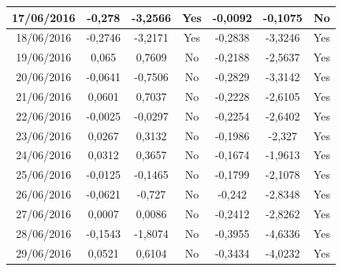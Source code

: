 \documentclass[11pt]{report}
\begin{document}
\begin{table}[!h]
\begin{tabular}{c|c|c|c|c|c|c|}
\multicolumn{1}{|c|}{\textbf{17/06/2016}} & \textbf{-0,278} & \textbf{-3,2566} & \textbf{Yes}     & \textbf{-0,0092} & \textbf{-0,1075} & \textbf{No}      \\ \hline
\multicolumn{1}{|c|}{18/06/2016}          & -0,2746         & -3,2171          & Yes              & -0,2838          & -3,3246          & Yes              \\ \hline
\multicolumn{1}{|c|}{19/06/2016}          & 0,065           & 0,7609           & No               & -0,2188          & -2,5637          & Yes              \\ \hline
\multicolumn{1}{|c|}{20/06/2016}          & -0,0641         & -0,7506          & No               & -0,2829          & -3,3142          & Yes              \\ \hline
\multicolumn{1}{|c|}{21/06/2016}          & 0,0601          & 0,7037           & No               & -0,2228          & -2,6105          & Yes              \\ \hline
\multicolumn{1}{|c|}{22/06/2016}          & -0,0025         & -0,0297          & No               & -0,2254          & -2,6402          & Yes              \\ \hline
\multicolumn{1}{|c|}{23/06/2016}          & 0,0267          & 0,3132           & No               & -0,1986          & -2,327           & Yes              \\ \hline
\multicolumn{1}{|c|}{24/06/2016}          & 0,0312          & 0,3657           & No               & -0,1674          & -1,9613          & Yes              \\ \hline
\multicolumn{1}{|c|}{25/06/2016}          & -0,0125         & -0,1465          & No               & -0,1799          & -2,1078          & Yes              \\ \hline
\multicolumn{1}{|c|}{26/06/2016}          & -0,0621         & -0,727           & No               & -0,242           & -2,8348          & Yes              \\ \hline
\multicolumn{1}{|c|}{27/06/2016}          & 0,0007          & 0,0086           & No               & -0,2412          & -2,8262          & Yes              \\ \hline
\multicolumn{1}{|c|}{28/06/2016}          & -0,1543         & -1,8074          & No               & -0,3955          & -4,6336          & Yes              \\ \hline
\multicolumn{1}{|c|}{29/06/2016}          & 0,0521          & 0,6104           & No               & -0,3434          & -4,0232          & Yes              \\ \hline

\end{tabular}
\end{table}
\end{document}
